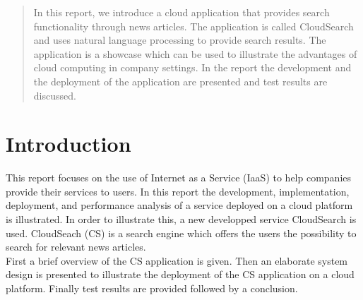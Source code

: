 \documentclass{acm_proc_article-sp}
\begin{document}
\begin{abstract}
In this report, we introduce a cloud application that provides search functionality through news articles.
The application is called CloudSearch and uses natural language processing to provide search results.
The application is a showcase which can be used to illustrate the advantages of cloud computing in company settings.
In the report the development and the deployment of the application are presented and test results are discussed.
\end{abstract}

\section{Introduction}
This report focuses on the use of Internet as a Service (IaaS) to help companies provide their services to users.
In this report the development, implementation, deployment, and performance analysis of a service deployed on a cloud platform is illustrated.
In order to illustrate this, a new developped service CloudSearch is used.
CloudSeach (CS) is a search engine which offers the users the possibility to search for relevant news articles.\\
First a brief overview of the CS application is given.
Then an elaborate system design is presented to illustrate the deployment of the CS application on a cloud platform.
Finally test results are provided followed by a conclusion.
\end{document}
